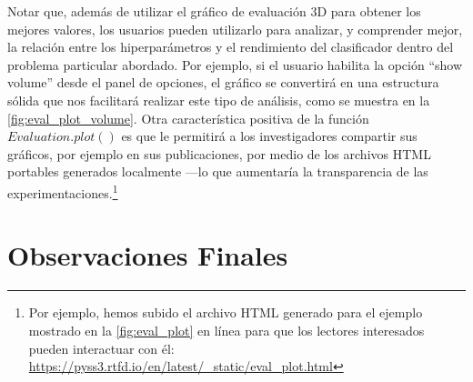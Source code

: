Notar que, además de utilizar el gráfico de evaluación 3D para obtener los mejores valores, los usuarios pueden utilizarlo para analizar, y comprender mejor, la relación entre los hiperparámetros y el rendimiento del clasificador dentro del problema particular abordado.
Por ejemplo, si el usuario habilita la opción ``show volume'' desde el panel de opciones, el gráfico se convertirá en una estructura sólida que nos facilitará  realizar este tipo de análisis, como se muestra en la \autoref{fig:eval_plot_volume}. Otra característica positiva de la función $Evaluation.plot()$ es que le permitirá a los investigadores compartir sus gráficos, por ejemplo en sus publicaciones, por medio de los archivos HTML portables generados localmente ---lo que aumentaría la transparencia de las experimentaciones.\footnote{Por ejemplo, hemos subido el archivo HTML generado para el ejemplo mostrado en la \autoref{fig:eval_plot} en línea para que los lectores interesados pueden interactuar con él: \url{https://pyss3.rtfd.io/en/latest/_static/eval_plot.html}}

\section{Observaciones Finales}

